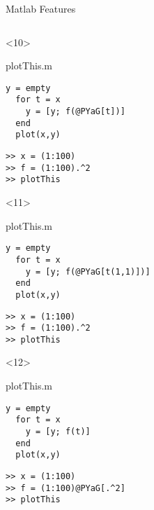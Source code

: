 \begin{frame}[fragile]{Matlab Features}
\begin{columns}
\begin{column}[T]{5cm}
      \begin{onlyenv}<10>
        \begin{block}{plotThis.m}
          \begin{Verbatim}[commandchars=@\[\]]
  y = empty
  for t = x
    y = [y; f(@PYaG[t])]
  end
  plot(x,y)
          \end{Verbatim}
        \end{block}
          \begin{Verbatim}[commandchars=@\[\]]
>> x = (1:100)
>> f = (1:100).^2
>> plotThis
        \end{Verbatim}
      \end{onlyenv}

      \begin{onlyenv}<11>
        \begin{block}{plotThis.m}
          \begin{Verbatim}[commandchars=@\[\]]
  y = empty
  for t = x
    y = [y; f(@PYaG[t(1,1)])]
  end
  plot(x,y)
          \end{Verbatim}
        \end{block}
          \begin{Verbatim}[commandchars=@\[\]]
>> x = (1:100)
>> f = (1:100).^2 
>> plotThis
        \end{Verbatim}
      \end{onlyenv}
      \begin{onlyenv}<12>
        \begin{block}{plotThis.m}
          \begin{Verbatim}[commandchars=@\[\]]
  y = empty
  for t = x
    y = [y; f(t)]
  end
  plot(x,y)
          \end{Verbatim}
        \end{block}
          \begin{Verbatim}[commandchars=@\[\]]
>> x = (1:100)
>> f = (1:100)@PYaG[.^2] 
>> plotThis
        \end{Verbatim}
      \end{onlyenv}


\end{column}
\end{columns}
\end{frame}
